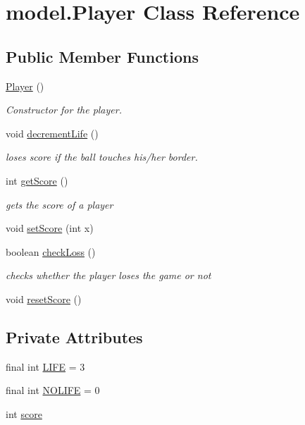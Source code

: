 \hypertarget{classmodel_1_1_player}{}\section{model.\+Player Class Reference}
\label{classmodel_1_1_player}
\subsection*{Public Member Functions}
\begin{DoxyCompactItemize}
\item 
\hyperlink{classmodel_1_1_player_a6922d8b0b084510c84540a3497504ed3}{Player} ()
\begin{DoxyCompactList}\small\item\em Constructor for the player. \end{DoxyCompactList}\item 
void \hyperlink{classmodel_1_1_player_a5551dad23bcab60638b37c8f54dd6796}{decrement\+Life} ()
\begin{DoxyCompactList}\small\item\em loses score if the ball touches his/her border. \end{DoxyCompactList}\item 
int \hyperlink{classmodel_1_1_player_a9e027a7ee08d451cde3e6743e2ef1d6d}{get\+Score} ()
\begin{DoxyCompactList}\small\item\em gets the score of a player \end{DoxyCompactList}\item 
void \hyperlink{classmodel_1_1_player_acb5f4cdd639aa3e68a5003ec81bdd47c}{set\+Score} (int x)
\item 
boolean \hyperlink{classmodel_1_1_player_a1027595469ab5de940ba2f6cbb29e5ef}{check\+Loss} ()
\begin{DoxyCompactList}\small\item\em checks whether the player loses the game or not \end{DoxyCompactList}\item 
void \hyperlink{classmodel_1_1_player_a1ce780b4bc3a1564934975b18e68df8c}{reset\+Score} ()
\end{DoxyCompactItemize}
\subsection*{Private Attributes}
\begin{DoxyCompactItemize}
\item 
final int \hyperlink{classmodel_1_1_player_a59153913ee338710aa1a33b68e5d0dbd}{L\+I\+FE} = 3
\item 
final int \hyperlink{classmodel_1_1_player_ad422bd3896f6c86c74fe49be0cae6759}{N\+O\+L\+I\+FE} = 0
\item 
int \hyperlink{classmodel_1_1_player_ad6d852aea99befddd30bb094222123d2}{score}
\end{DoxyCompactItemize}


